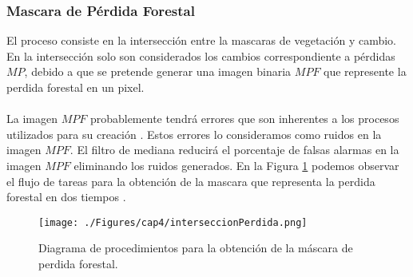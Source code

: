 \subsubsection{Mascara de P\'erdida Forestal}
El proceso consiste en la intersecci\'on entre la mascaras de vegetaci\'on y cambio. En la intersecci\'on solo son considerados los cambios correspondiente a p\'erdidas  $ MP $, debido a que se pretende generar una imagen binaria $ MPF $ que represente la perdida forestal en un pixel.\\~\\
La imagen $ MPF $ probablemente tendr\'a errores que son inherentes a los procesos utilizados para su creación \cite{lovell2001filtering}. Estos errores lo consideramos como ruidos en la imagen $ MPF $. El filtro de mediana \cite{gonzalez2002woods} reducir\'a el porcentaje de falsas alarmas en la imagen $ MPF $ eliminando los ruidos generados.
En la Figura \ref{fig:intersPerdida} podemos observar el flujo de tareas para la obtenci\'on de la mascara que representa la perdida forestal en dos tiempos .
\begin{figure}[H]
	\centering
	\texttt{[image: ./Figures/cap4/interseccionPerdida.png]}
	\caption{Diagrama de procedimientos para la obtenci\'on de la m\'ascara de perdida forestal.}
	\label{fig:intersPerdida}
\end{figure}

